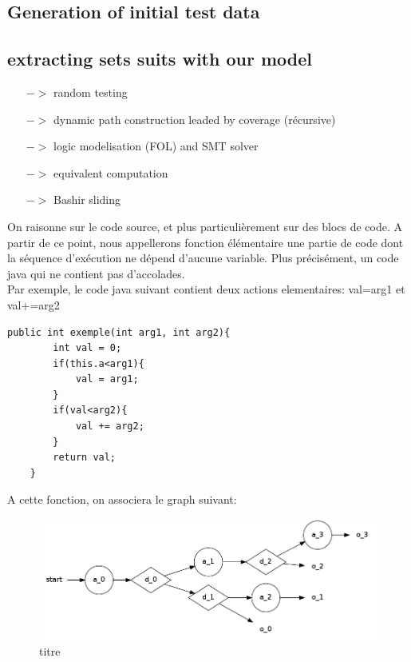 \documentclass[a4paper]{report}
\begin{document}
\subsection*{Generation of initial test data}




\subsection*{extracting sets suits with our model}

\begin{itemize}
\item[$->$] random testing
\item[$->$] dynamic path construction leaded by coverage (récursive)
\item[$->$] logic modelisation (FOL) and SMT solver
\item[$->$] equivalent computation
\item[$->$] Bashir sliding
\end{itemize}


On raisonne sur le code source, et plus particulièrement sur des blocs de code. A partir de ce point, nous appellerons fonction élémentaire une partie de code dont la séquence d'exécution ne dépend d'aucune variable. Plus précisément, un code java qui ne contient pas d'accolades.\\
\newline
Par exemple, le code java suivant contient deux actions elementaires: val=arg1 et val+=arg2\\

\begin{lstlisting}
public int exemple(int arg1, int arg2){
		int val = 0;
		if(this.a<arg1){
			val = arg1;
		}
		if(val<arg2){
			val += arg2;
		}
		return val;
	}
\end{lstlisting}
A cette fonction, on associera le graph suivant:\\


\begin{figure}[h!]
   \caption{\label{étiquette} titre}
   \includegraphics[scale=0.3]{../graphviz/doubleStackGraph.png}
\end{figure}
\end{document}
